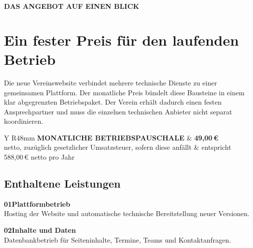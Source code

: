 \documentclass[11pt,a4paper]{article}
\newcommand{\eur}[1]{#1\,€}
\newcommand{\eyebrow}[1]{%
  {\sffamily\footnotesize\bfseries\color{NordBlue}\MakeUppercase{#1}}\\[2mm]
}
\begin{document}
\hypersetup{pageanchor=true}
\nopagecolor
\color{NordInk}

\eyebrow{Das Angebot auf einen Blick}
\section{Ein fester Preis für den laufenden Betrieb}

Die neue Vereinswebsite verbindet mehrere technische Dienste zu einer gemeinsamen Plattform. Der monatliche Preis bündelt diese Bausteine in einem klar abgegrenzten Betriebspaket. Der Verein erhält dadurch einen festen Ansprechpartner und muss die einzelnen technischen Anbieter nicht separat koordinieren.

\begin{softbox}
  \begin{tabularx}{\textwidth}{Y R{48mm}}
    {\sffamily\small\bfseries\color{NordMuted}\MakeUppercase{Monatliche Betriebspauschale}} &
    {\sffamily\fontsize{27}{29}\selectfont\bfseries\color{NordNavy}\eur{49,00}} \\
    netto, zuzüglich gesetzlicher Umsatzsteuer, sofern diese anfällt &
    {\sffamily\small\color{NordMuted}entspricht \eur{588,00} netto pro Jahr} \\
  \end{tabularx}
\end{softbox}

\subsection{Enthaltene Leistungen}

\noindent
\begin{minipage}[t]{0.487\textwidth}
  \begin{servicebox}
    {\sffamily\bfseries\color{NordBlue}01\quad Plattformbetrieb}\\[2mm]
    Hosting der Website und automatische technische Bereitstellung neuer Versionen.
  \end{servicebox}
\end{minipage}\hfill
\begin{minipage}[t]{0.487\textwidth}
  \begin{servicebox}
    {\sffamily\bfseries\color{NordBlue}02\quad Inhalte und Daten}\\[2mm]
    Datenbankbetrieb für Seiteninhalte, Termine, Teams und Kontaktanfragen.
  \end{servicebox}
\end{minipage}
\end{document}

